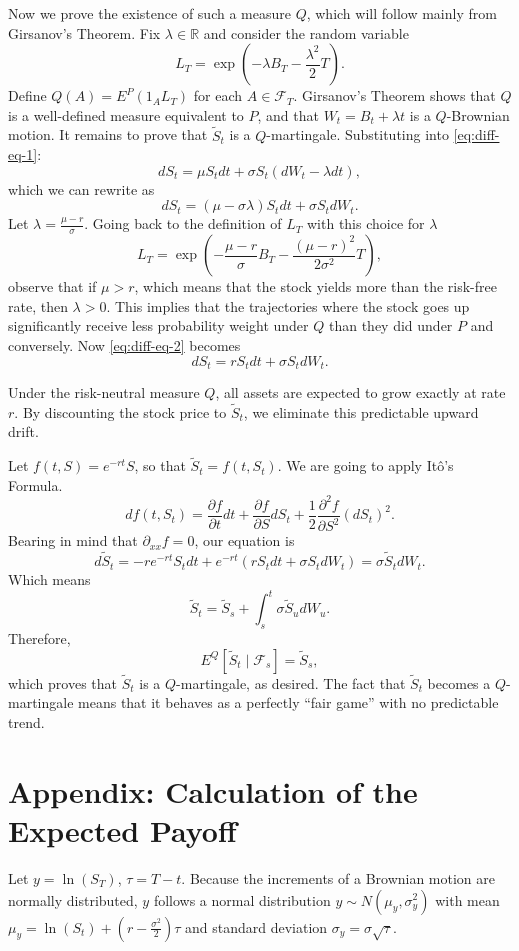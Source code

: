 \documentclass{article}
\def\R{\mathbb{R}}
\theoremstyle{definition}
\theoremstyle{remark}
\begin{document}
Now we prove the existence of such a measure $Q$, which will follow mainly from Girsanov's Theorem. Fix $\lambda\in\R$ and consider the random variable\[
L_T=\exp\left(-\lambda B_T-\frac{\lambda^2}{2}T\right).
\]Define $Q(A)=E^P(1_AL_T)$ for each $A\in\mathcal F_T$. Girsanov's Theorem shows that $Q$ is a well-defined measure equivalent to $P$, and that $W_t=B_t+\lambda t$ is a $Q$-Brownian motion. It remains to prove that $\tilde S_t$ is a $Q$-martingale. Substituting into \eqref{eq:diff-eq-1}:
\[
dS_t = \mu S_tdt+\sigma S_t(dW_t-\lambda dt),
\]
which we can rewrite as
\begin{equation}\label{eq:diff-eq-2}
    dS_t= (\mu-\sigma\lambda)S_tdt+\sigma S_tdW_t.
\end{equation}
Let $\lambda = \frac{\mu-r}{\sigma}$. Going back to the definition of $L_T$ with this choice for $\lambda$
\[
L_T=\exp\left(-\frac{\mu-r}{\sigma} B_T-\frac{(\mu-r)^2}{2\sigma^2}T\right),
\]
observe that if $\mu>r$, which means that the stock yields more than the risk-free rate, then $\lambda > 0$. This implies that the trajectories where the stock goes up significantly receive less probability weight under $Q$ than they did under $P$ and conversely. Now \eqref{eq:diff-eq-2} becomes
\begin{equation}\label{eq:diff-eq-3}
    dS_t = r S_t dt + \sigma S_t dW_t.
\end{equation}

Under the risk-neutral measure $Q$, all assets are expected to grow exactly at rate $r$. By discounting the stock price to $\tilde{S}_t$, we eliminate this predictable upward drift. 

Let $f(t,S)=e^{-rt}S$, so that $\tilde S_t=f(t,S_t)$. We are going to apply Itô's Formula.
\[
df(t,S_t)=\frac{\partial f}{\partial t}dt +\frac{\partial f}{\partial S}dS_t +\frac{1}{2}\frac{\partial ^2 f}{\partial S^2}(dS_t)^2.
\]
Bearing in mind that $\partial_{xx} f = 0$, our equation is
\[
d\tilde S_t= -r e^{-rt}S_t dt+e^{-rt}(rS_t dt+ \sigma S_t dW_t)=\sigma\tilde S_t dW_t.
\]
Which means
\[
\tilde S_t=\tilde S_s+\int_s^t \sigma \tilde S_u dW_u.
\]
Therefore,
\[
E^Q[\tilde S_t \mid \mathcal F_s]=\tilde S_s,
\]
which proves that $\tilde S_t$ is a $Q$-martingale, as desired. The fact that $\tilde{S}_t$ becomes a $Q$-martingale means that it behaves as a perfectly ``fair game'' with no predictable trend.
\newpage
\section*{Appendix: Calculation of the Expected Payoff}
Let $y = \ln(S_T)$, $\tau=T-t$. Because the increments of a Brownian motion are normally distributed, $y$ follows a normal distribution $y \sim N(\mu_y, \sigma_y^2)$ with mean $\mu_y = \ln(S_t) + \left(r - \frac{\sigma^2}{2}\right)\tau$ and standard deviation $\sigma_y = \sigma\sqrt{\tau}$. 
\end{document}
